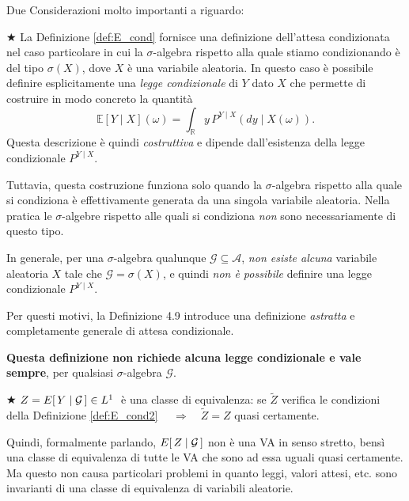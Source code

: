 \noindent Due Considerazioni molto importanti a riguardo:

\bigskip
\noindent \(\bigstar\) La Definizione \ref{def:E_cond} fornisce una definizione dell’attesa condizionata nel caso particolare in cui la $\sigma$-algebra rispetto alla quale stiamo condizionando è
del tipo $\sigma(X)$, dove $X$ è una variabile aleatoria. In questo caso è 
possibile definire esplicitamente una \emph{legge condizionale} di $Y$ dato $X$ che permette di costruire in modo concreto la quantità
\[
\mathbb{E}[Y\mid X](\omega)
  = \int_{\mathbb{R}} y \, P^{Y\mid X}(dy \mid X(\omega)).
\]
Questa descrizione è quindi \emph{costruttiva} e dipende dall’esistenza della 
legge condizionale $P^{Y\mid X}$.

\medskip
\noindent Tuttavia, questa costruzione funziona solo quando la $\sigma$-algebra
rispetto alla quale si condiziona è effettivamente generata da una singola
variabile aleatoria. Nella pratica le $\sigma$-algebre rispetto alle quali si condiziona \emph{non} sono
necessariamente di questo tipo.
\medskip

\noindent In generale, per una $\sigma$-algebra qualunque $\mathcal{G}\subseteq \mathcal{A}$, \emph{non esiste alcuna} variabile aleatoria $X$ tale che $\mathcal{G}=\sigma(X)$, e quindi \emph{non è possibile} definire una legge condizionale $P^{Y\mid X}$.

\medskip

\noindent Per questi motivi, la Definizione 4.9 introduce una definizione \emph{astratta} e completamente generale di attesa condizionale.

\medskip

\noindent \textbf{Questa definizione non richiede alcuna legge condizionale e vale sempre}, per qualsiasi $\sigma$-algebra $\mathcal{G}$.

\bigskip
\noindent \(\bigstar\) $Z = E\!\left[\,Y\mid \mathcal{G}\,\right]\in L^1\;$ è una classe di equivalenza: se $\tilde{Z}$ verifica le condizioni della Definizione \ref{def:E_cond2} $\quad \Rightarrow\quad \tilde{Z} = Z$ quasi certamente.

\medskip
Quindi, formalmente parlando, $E\!\left[\,Z\mid \mathcal{G}\,\right]$ non è una VA in senso stretto, bensì una classe di equivalenza di tutte le VA che sono ad essa uguali quasi certamente. Ma questo non causa particolari problemi in quanto leggi, valori attesi, etc. sono invarianti di una classe di equivalenza di variabili aleatorie.

